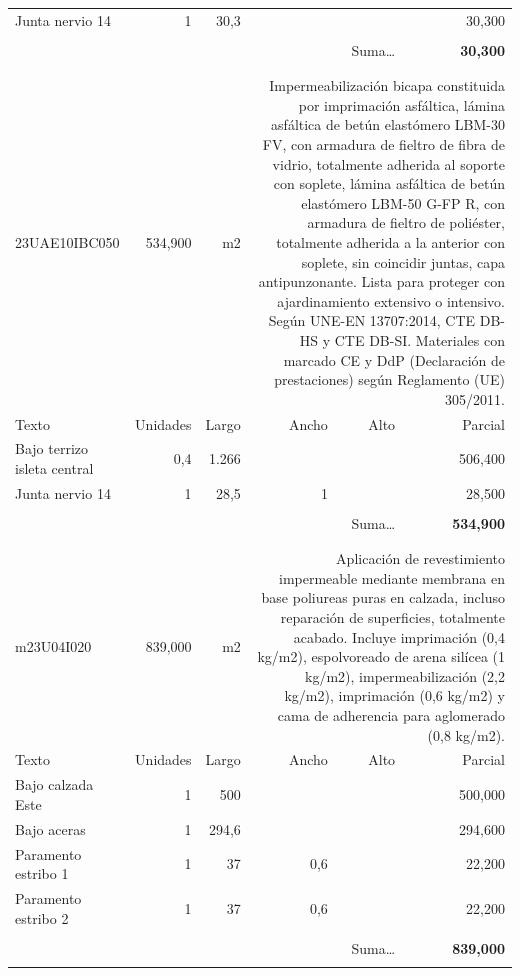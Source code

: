 \documentclass{book}%
\begin{document}
\begin{longtable}{lrrrrr}
\hline%
\multicolumn{1}{p{3.5cm}}{Junta nervio 14}&1&30,3&&&    30,300\\%
&&&&&\\%
\multicolumn{5}{r}{Suma\ldots}&\textbf{    30,300}\\%
\hline%
&&&&&\\%
&&&&&\\%
23UAE10IBC050&   534,900& m2&\multicolumn{3}{p{6cm}}{\scriptsize Impermeabilización bicapa constituida por imprimación asfáltica, lámina asfáltica de betún elastómero LBM-30 FV, con armadura de fieltro de fibra de vidrio, totalmente adherida al soporte con soplete, lámina asfáltica de betún elastómero LBM-50 G-FP R, con armadura de fieltro de poliéster, totalmente adherida a la anterior con soplete, sin coincidir juntas, capa antipunzonante. Lista para proteger con ajardinamiento extensivo o intensivo. Según UNE-EN 13707:2014, CTE DB-HS y CTE DB-SI. Materiales con marcado CE y DdP (Declaración de prestaciones) según Reglamento (UE) 305/2011.\normalsize}\\%
Texto&Unidades&Largo&Ancho&Alto&Parcial\\%
\hline%
\multicolumn{1}{p{3.5cm}}{Bajo terrizo isleta central }&0,4&1.266&&&   506,400\\%
\multicolumn{1}{p{3.5cm}}{Junta nervio 14}&1&28,5&1&&    28,500\\%
&&&&&\\%
\multicolumn{5}{r}{Suma\ldots}&\textbf{   534,900}\\%
\hline%
&&&&&\\%
&&&&&\\%
m23U04I020&   839,000& m2&\multicolumn{3}{p{6cm}}{\scriptsize Aplicación de revestimiento impermeable mediante membrana en base poliureas puras en calzada, incluso reparación de superficies, totalmente acabado. Incluye imprimación (0,4 kg/m2), espolvoreado de arena silícea (1 kg/m2), impermeabilización (2,2 kg/m2), imprimación (0,6 kg/m2) y cama de adherencia para aglomerado (0,8 kg/m2).\normalsize}\\%
Texto&Unidades&Largo&Ancho&Alto&Parcial\\%
\hline%
\multicolumn{1}{p{3.5cm}}{Bajo calzada Este }&1&500&&&   500,000\\%
\multicolumn{1}{p{3.5cm}}{Bajo aceras }&1&294,6&&&   294,600\\%
\multicolumn{1}{p{3.5cm}}{Paramento estribo 1}&1&37&0,6&&    22,200\\%
\multicolumn{1}{p{3.5cm}}{Paramento estribo 2}&1&37&0,6&&    22,200\\%
&&&&&\\%
\multicolumn{5}{r}{Suma\ldots}&\textbf{   839,000}\\%
\hline%
&&&&&\\%
\end{longtable}%
\newpage
\end{document}
